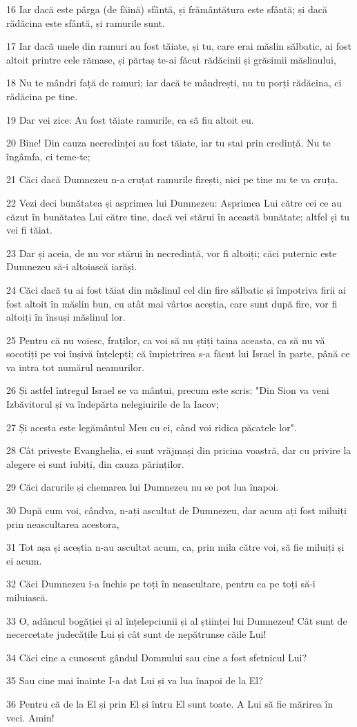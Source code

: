 \par 16 Iar dacă este pârga (de făină) sfântă, și frământătura este sfântă; și dacă rădăcina este sfântă, și ramurile sunt.
\par 17 Iar dacă unele din ramuri au fost tăiate, și tu, care erai măslin sălbatic, ai fost altoit printre cele rămase, și părtaș te-ai făcut rădăcinii și grăsimii măslinului,
\par 18 Nu te mândri față de ramuri; iar dacă te mândrești, nu tu porți rădăcina, ci rădăcina pe tine.
\par 19 Dar vei zice: Au fost tăiate ramurile, ca să fiu altoit eu.
\par 20 Bine! Din cauza necredinței au fost tăiate, iar tu stai prin credință. Nu te îngâmfa, ci teme-te;
\par 21 Căci dacă Dumnezeu n-a cruțat ramurile firești, nici pe tine nu te va cruța.
\par 22 Vezi deci bunătatea și asprimea lui Dumnezeu: Asprimea Lui către cei ce au căzut în bunătatea Lui către tine, dacă vei stărui în această bunătate; altfel și tu vei fi tăiat.
\par 23 Dar și aceia, de nu vor stărui în necredință, vor fi altoiți; căci puternic este Dumnezeu să-i altoiască iarăși.
\par 24 Căci dacă tu ai fost tăiat din măslinul cel din fire sălbatic și împotriva firii ai fost altoit în măslin bun, cu atât mai vârtos aceștia, care sunt după fire, vor fi altoiți în însuși măslinul lor.
\par 25 Pentru că nu voiesc, fraților, ca voi să nu știți taina aceasta, ca să nu vă socotiți pe voi înșivă înțelepți; că împietrirea s-a făcut lui Israel în parte, până ce va intra tot numărul neamurilor.
\par 26 Și astfel întregul Israel se va mântui, precum este scris: "Din Sion va veni Izbăvitorul și va îndepărta nelegiuirile de la Iacov;
\par 27 Și acesta este legământul Meu cu ei, când voi ridica păcatele lor".
\par 28 Cât privește Evanghelia, ei sunt vrăjmași din pricina voastră, dar cu privire la alegere ei sunt iubiți, din cauza părinților.
\par 29 Căci darurile și chemarea lui Dumnezeu nu se pot lua înapoi.
\par 30 După cum voi, cândva, n-ați ascultat de Dumnezeu, dar acum ați fost miluiți prin neascultarea acestora,
\par 31 Tot așa și aceștia n-au ascultat acum, ca, prin mila către voi, să fie miluiți și ei acum.
\par 32 Căci Dumnezeu i-a închis pe toți în neascultare, pentru ca pe toți să-i miluiască.
\par 33 O, adâncul bogăției și al înțelepciunii și al științei lui Dumnezeu! Cât sunt de necercetate judecățile Lui și cât sunt de nepătrunse căile Lui!
\par 34 Căci cine a cunoscut gândul Domnului sau cine a fost sfetnicul Lui?
\par 35 Sau cine mai înainte I-a dat Lui și va lua înapoi de la El?
\par 36 Pentru că de la El și prin El și întru El sunt toate. A Lui să fie mărirea în veci. Amin!

